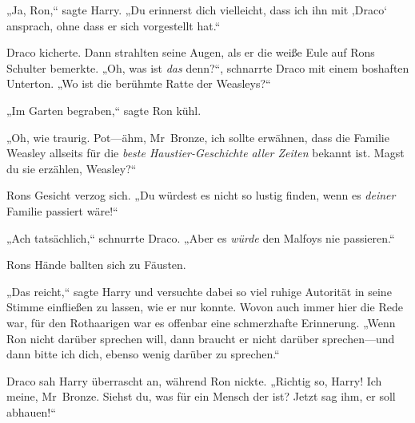 „Ja, Ron,“ sagte Harry. „Du erinnerst dich vielleicht, dass ich ihn mit ‚Draco‘ ansprach, ohne dass er sich vorgestellt hat.“

Draco kicherte. Dann strahlten seine Augen, als er die weiße Eule auf Rons Schulter bemerkte. „Oh, was ist \emph{das} denn?“, schnarrte Draco mit einem boshaften Unterton. „Wo ist die berühmte Ratte der Weasleys?“

„Im Garten begraben,“ sagte Ron kühl.

„Oh, wie traurig. Pot—ähm, Mr~Bronze, ich sollte erwähnen, dass die Familie Weasley allseits für die \emph{beste Haustier-Geschichte aller Zeiten} bekannt ist. Magst du sie erzählen, Weasley?“

Rons Gesicht verzog sich. „Du würdest es nicht so lustig finden, wenn es \emph{deiner} Familie passiert wäre!“

„Ach tatsächlich,“ schnurrte Draco. „Aber es \emph{würde} den Malfoys nie passieren.“

Rons Hände ballten sich zu Fäusten.

„Das reicht,“ sagte Harry und versuchte dabei so viel ruhige Autorität in seine Stimme einfließen zu lassen, wie er nur konnte. Wovon auch immer hier die Rede war, für den Rothaarigen war es offenbar eine schmerzhafte Erinnerung. „Wenn Ron nicht darüber sprechen will, dann braucht er nicht darüber sprechen—und dann bitte ich dich, ebenso wenig darüber zu sprechen.“

Draco sah Harry überrascht an, während Ron nickte. „Richtig so, Harry! Ich meine, Mr~Bronze. Siehst du, was für ein Mensch der ist? Jetzt sag ihm, er soll abhauen!“

